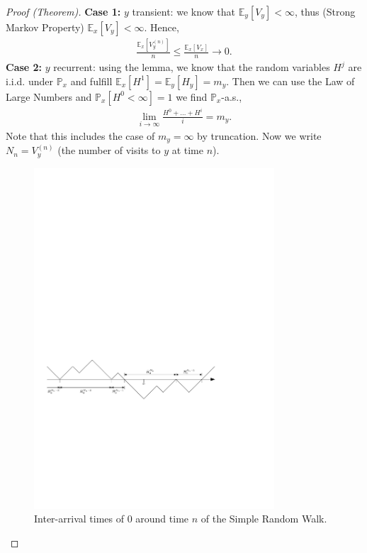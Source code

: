 \begin{proof}[Proof (Theorem)]
	\textbf{Case 1:} $y$ transient:	we know that $\mathbb{E}_{y} \left[ V_y \right] < \infty$, thus (Strong Markov Property) $\mathbb{E}_{x} \left[ V_y \right] < \infty$. Hence,
	\begin{align}
		\frac{\mathbb{E}_{x} \left[ V_y^{(n)} \right] }{n} \leq \frac{\mathbb{E}_{x} \left[ V_x \right] }{n} \to 0
	.\end{align}
	\textbf{Case 2:} $y$ recurrent: using the lemma, we know that the random variables $H^j$ are i.i.d. under $\mathbb{P}_{x}$ and fulfill $\mathbb{E}_{x} \left[ H^1 \right] = \mathbb{E}_{y} \left[ H_y \right]  = m_y$. Then we can use the Law of Large Numbers and $\mathbb{P}_{x} \left[ H^0 < \infty \right] =1$ we find $\mathbb{P}_{x}$-a.s.,
	\begin{align}
		\lim_{i\to \infty } \frac{H^0 + \ldots + H^i}{i} = m_y
	.\end{align}
	Note that this includes the case of $m_y=\infty$ by truncation. Now we write $N_n = V_y^{(n)}$ (the number of visits to $y$ at time $n$).
	\begin{figure}[h!]
		\centering
		\includegraphics[width=0.8\textwidth]{figures/inter_arrival_ineq.pdf}
		\caption{Inter-arrival times of $0$ around time $n$ of the Simple Random Walk.}
	\end{figure}


\end{proof}
